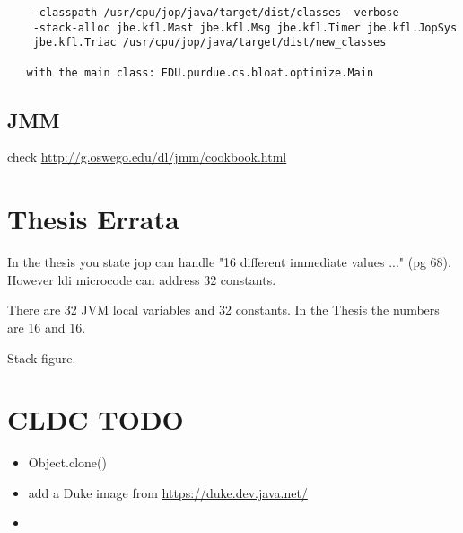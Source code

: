 \documentclass[a4paper,12pt]{scrartcl}
\begin{document}
\begin{verbatim}
    -classpath /usr/cpu/jop/java/target/dist/classes -verbose
    -stack-alloc jbe.kfl.Mast jbe.kfl.Msg jbe.kfl.Timer jbe.kfl.JopSys
    jbe.kfl.Triac /usr/cpu/jop/java/target/dist/new_classes

   with the main class: EDU.purdue.cs.bloat.optimize.Main
\end{verbatim}

\subsection{JMM}

check \url{http://g.oswego.edu/dl/jmm/cookbook.html}

\section{Thesis Errata}

In the thesis you state jop can handle "16 different immediate
values ..." (pg 68). However ldi microcode can address 32 constants.

There are 32 JVM local variables and 32 constants. In the Thesis the
numbers are 16 and 16.

Stack figure.

\section{CLDC TODO}

\begin{itemize}
    \item Object.clone()
    \item add a Duke image from \url{https://duke.dev.java.net/}
    \item
\end{itemize}
\end{document}
